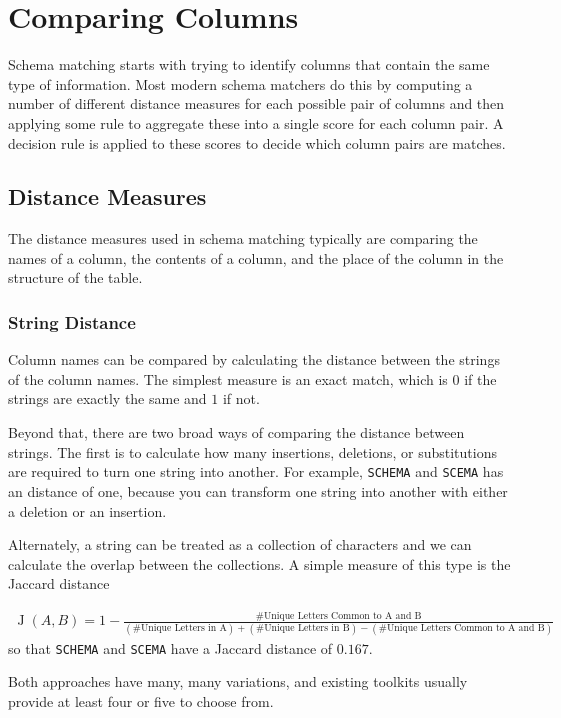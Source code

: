 \documentclass{datamade}
\theoremstyle{definition}
\theoremstyle{remark}
\begin{document}
\section*{Comparing Columns}
Schema matching starts with trying to identify columns that contain
the same type of information. Most modern schema matchers do this by
computing a number of different distance measures for each possible
pair of columns and then applying some rule to aggregate these into a
single score for each column pair. A decision rule is applied to these
scores to decide which column pairs are matches.

\subsection*{Distance Measures}
The distance measures used in schema matching typically are comparing
the names of a column, the contents of a column, and the place of the
column in the structure of the table.

\subsubsection*{String Distance}
Column names can be compared by calculating the distance between the
strings of the column names. The simplest measure is an exact match,
which is $0$ if the strings are exactly the same and $1$ if not.

Beyond that, there are two broad ways of comparing the distance
between strings. The first is to calculate how many insertions,
deletions, or substitutions are required to turn one string into
another. For example, \verb+SCHEMA+ and \verb+SCEMA+ has an distance
of one, because you can transform one string into another with either
a deletion or an insertion.

Alternately, a string can be treated as a collection of characters and
we can calculate the overlap between the collections. A simple measure
of this type is the Jaccard distance

\begin{align*}
\operatorname{J}(A, B) = 1 - \frac{\text{\# Unique Letters
    Common to A and B}}{(\text{\# Unique Letters in A}) +
    (\text{\# Unique Letters in B}) - (\text{\# Unique Letters
      Common to A and B})}
\end{align*}
so that \verb+SCHEMA+ and \verb+SCEMA+ have a Jaccard distance of $0.167$. 

Both approaches have many, many variations, and existing toolkits
usually provide at least four or five to choose from.
\end{document}

